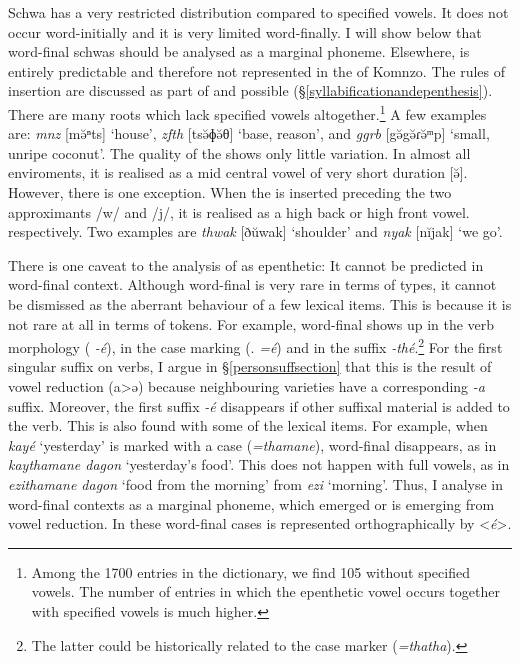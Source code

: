 \largerpage
Schwa has a very restricted distribution compared to specified vowels. It does not occur word-initially and it is very limited word-finally. I will show below that word-final schwas should be analysed as a marginal phoneme. Elsewhere,  is entirely predictable and therefore not represented in the  of Komnzo. The rules of  insertion are discussed as part of  and possible  ({\S}\ref{syllabificationandepenthesis}). There are many roots which lack specified vowels altogether.\footnote{Among the 1700 entries in the dictionary, we find 105 without specified vowels. The number of entries in which the epenthetic vowel occurs together with specified vowels is much higher.} A few examples are: \emph{mnz} [mə̆ⁿts] `house', \emph{zfth} [tsə̆ɸə̆θ] `base, reason', and \emph{ggrb} [{\ᵑ}gə̆{\ᵑ}gə̆ɾə̆ᵐp] `small, unripe coconut'. The quality of the  shows only little variation. In almost all enviroments, it is realised as a mid central vowel of very short duration [ə̆]. However, there is one exception. When the  is inserted preceding the two approximants /w/ and /j/, it is realised as a high back or high front vowel. respectively. Two examples are \emph{thwak} [ðŭwak] `shoulder' and \emph{nyak} [nĭjak] `we go'.

There is one caveat to the analysis of  as epenthetic: It cannot be predicted in word-final context. Although word-final  is very rare in terms of types, it cannot be dismissed as the aberrant behaviour of a few lexical items. This is because it is not rare at all in terms of tokens. For example, word-final  shows up in the verb morphology (\Fsg{} \emph{-é}), in the case marking (\Erg.{\Nsg} \emph{=é}) and in the  suffix \emph{-thé}.\footnote{The latter could be historically related to the  case marker (\emph{=thatha}).} For the first singular suffix on verbs, I argue in {\S}\ref{personsuffsection} that this is the result of vowel reduction (a>ə) because neighbouring varieties have a corresponding \emph{-a} suffix. Moreover, the first  suffix \emph{-é} disappears if other suffixal material is added to the verb. This is also found with some of the lexical items. For example, when \emph{kayé} `yesterday' is marked with a   case (\emph{=thamane}), word-final  disappears, as in \emph{kaythamane dagon} `yesterday's food'. This does not happen with full vowels, as in \emph{ezithamane dagon} `food from the morning' from \emph{ezi} `morning'. Thus, I analyse  in word-final contexts as a marginal phoneme, which emerged or is emerging from vowel reduction. In these word-final cases  is represented orthographically by <\emph{é}>.

